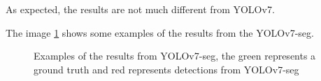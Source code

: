 As expected, the results are not much different from YOLOv7.

The image \ref{figyoloseginferenceexample} shows some examples of the results from the YOLOv7-seg.
\begin{figure}[H]
    \centering
    \qquad
    \caption{Examples of the results from YOLOv7-seg, the green represents a ground truth and red represents detections from YOLOv7-seg}%
    \label{figyoloseginferenceexample}
\end{figure}

